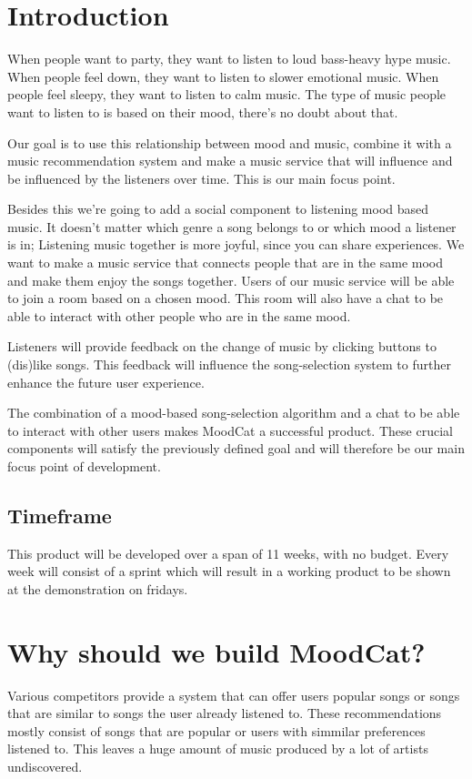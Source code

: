 \chapter{Introduction}

When people want to party, they want to listen to loud bass-heavy hype music.
When people feel down, they want to listen to slower emotional music.
When people feel sleepy, they want to listen to calm music.
The type of music people want to listen to is based on their mood, there's no doubt about that.

Our goal is to use this relationship between mood and music,
combine it with a music recommendation system and make a music service
that will influence and be influenced by the listeners over time.
This is our main focus point.

Besides this we're going to add a social component to listening mood based music.
It doesn't matter which genre a song belongs to or which mood a listener is in;
Listening music together is more joyful, since you can share experiences.
We want to make a music service that connects people that are in the same mood and make them enjoy the songs together.
Users of our music service will be able to join a room based on a chosen mood.
This room will also have a chat to be able to interact with other people who are in the same mood.

Listeners will provide feedback on the change of music by clicking buttons to (dis)like songs.
This feedback will influence the song-selection system to further enhance the future user experience.

The combination of a mood-based song-selection algorithm and a chat to be able to interact with other users makes MoodCat a successful product.
These crucial components will satisfy the previously defined goal and will therefore be our main focus point of development.

\section{Timeframe}
This product will be developed over a span of 11 weeks, with no budget.
Every week will consist of a sprint which will result in a working product to be shown at the demonstration on fridays.

\chapter{Why should we build MoodCat?}
Various competitors provide a system that can offer users popular songs or songs that are similar to songs the user already listened to.
These recommendations mostly consist of songs that are popular or users with simmilar preferences listened to.
This leaves a huge amount of music produced by a lot of artists undiscovered.

